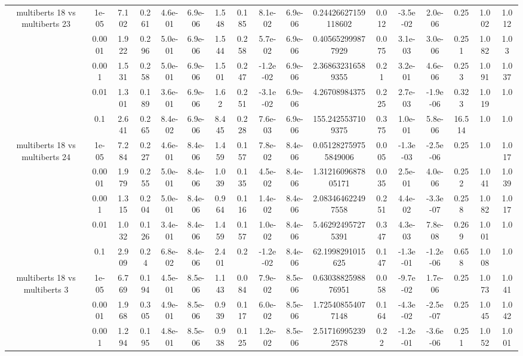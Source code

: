 \begin{tabular}{|c|c|c|c|c|c|c|c|c|c|c|c|c|c|c|c|c|}
\hline
\multirow{5}{*}{multiberts 18 vs multiberts 23} & 1e-05 & 7.102 & 0.261 & 4.6e-01 & 6.9e-06 & 1.548 & 0.185 & 8.1e-02 & 6.9e-06 & 0.24426627159118602 & 0.012 & -3.5e-02 & 2.0e-06 & 0.25 & 1.002 & 1.012 \\
 & 0.0001 & 1.922 & 0.296 & 5.0e-01 & 6.9e-06 & 1.544 & 0.258 & 5.7e-02 & 6.9e-06 & 0.405652999877929 & 0.075 & 3.1e-03 & 3.0e-06 & 0.251 & 1.082 & 1.03 \\
 & 0.001 & 1.531 & 0.258 & 5.0e-01 & 6.9e-06 & 1.501 & 0.247 & -1.2e-02 & 6.9e-06 & 2.368632316589355 & 0.21 & 3.2e-01 & 4.6e-06 & 0.253 & 1.091 & 1.037 \\
 & 0.01 & 1.301 & 0.189 & 3.6e-01 & 6.9e-06 & 1.62 & 0.251 & -3.1e-02 & 6.9e-06 & 4.26708984375 & 0.225 & 2.7e-03 & -1.9e-06 & 0.323 & 1.019 & 1.0 \\
 & 0.1 & 2.641 & 0.265 & 8.4e-02 & 6.9e-06 & 8.445 & 0.228 & 7.6e-03 & 6.9e-06 & 155.2425537109375 & 0.375 & 1.0e-01 & 5.8e-06 & 16.514 & 1.0 & 1.0 \\
\hline
\multirow{5}{*}{multiberts 18 vs multiberts 24} & 1e-05 & 7.284 & 0.227 & 4.6e-01 & 8.4e-06 & 1.459 & 0.157 & 7.8e-02 & 8.4e-06 & 0.051282759755849006 & 0.005 & -1.3e-03 & -2.5e-06 & 0.25 & 1.0 & 1.017 \\
 & 0.0001 & 1.979 & 0.255 & 5.0e-01 & 8.4e-06 & 1.039 & 0.135 & 4.5e-02 & 8.4e-06 & 1.3121609687805171 & 0.035 & 2.5e-01 & 4.0e-06 & 0.252 & 1.041 & 1.039 \\
 & 0.001 & 1.315 & 0.204 & 5.0e-01 & 8.4e-06 & 0.964 & 0.116 & 1.4e-02 & 8.4e-06 & 2.083464622497558 & 0.251 & 4.4e-02 & -3.3e-07 & 0.258 & 1.082 & 1.017 \\
 & 0.01 & 1.032 & 0.126 & 3.4e-01 & 8.4e-06 & 1.459 & 0.157 & 1.0e-02 & 8.4e-06 & 5.462924957275391 & 0.347 & 4.3e-03 & 7.8e-08 & 0.269 & 1.001 & 1.0 \\
 & 0.1 & 2.909 & 0.24 & 6.8e-02 & 8.4e-06 & 2.401 & 0.2 & -1.2e-02 & 8.4e-06 & 62.1998291015625 & 0.147 & -1.3e-01 & -1.2e-06 & 0.658 & 1.008 & 1.0 \\
\hline
\multirow{5}{*}{multiberts 18 vs multiberts 3} & 1e-05 & 6.769 & 0.194 & 4.5e-01 & 8.5e-06 & 1.143 & 0.084 & 7.9e-02 & 8.5e-06 & 0.6303882598876951 & 0.058 & -9.7e-02 & 1.7e-06 & 0.25 & 1.073 & 1.041 \\
 & 0.0001 & 1.968 & 0.305 & 4.9e-01 & 8.5e-06 & 0.939 & 0.117 & 6.0e-02 & 8.5e-06 & 1.725408554077148 & 0.164 & -4.3e-02 & -2.5e-07 & 0.25 & 1.045 & 1.042 \\
 & 0.001 & 1.294 & 0.195 & 4.8e-01 & 8.5e-06 & 0.938 & 0.125 & 1.2e-02 & 8.5e-06 & 2.517169952392578 & 0.22 & -1.2e-01 & -3.6e-06 & 0.251 & 1.052 & 1.001 \\

\end{tabular}

